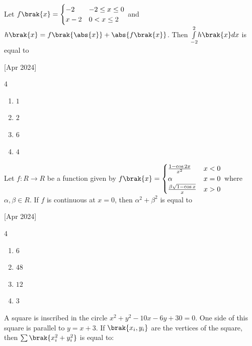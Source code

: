     \item Let $
    f\brak{x}=
    \begin{cases}
    -2 & -2\leq x \leq 0\\
    x-2 & 0 < x \leq2
    \end{cases}$ and $h\brak{x}=f\brak{\abs{x}}+\abs{f\brak{x}}$. Then $\underset{-2}{\overset{2}{\int}}h\brak{x} dx$ is equal to
    
    \hfill{[Apr 2024]}

        \begin{multicols}{4}
            \begin{enumerate}
                \item $1$
                \item $2$
                \item $6$
                \item $4$
            \end{enumerate}
        \end{multicols}

    \item Let $f:R\to R$ be a function given by 
    $f\brak{x}=
    \begin{cases}
        \frac{1-\cos2x}{x^2} & x<0\\
        \alpha & x=0\\
        \frac{\beta\sqrt{1-\cos x}}{x} & x>0
    \end{cases}$ where $\alpha,\beta\in R$. If $f$ is continuous at $x=0$, then $\alpha^2+\beta^2$ is equal to
    
    \hfill{[Apr 2024]}

		\begin{multicols}{4}
			\begin{enumerate}
				\item $6$
				\item $48$
				\item $12$
				\item $3$
			\end{enumerate}
		\end{multicols}

    \item A square is inscribed in the circle $x^2+y^2-10x-6y+30=0$. One side of this square is parallel to $y=x+3$. If $\brak{x_i,y_i}$ are the vertices of the square, then $\sum\brak{x_i^2+y_i^2}$ is equal to:
    
